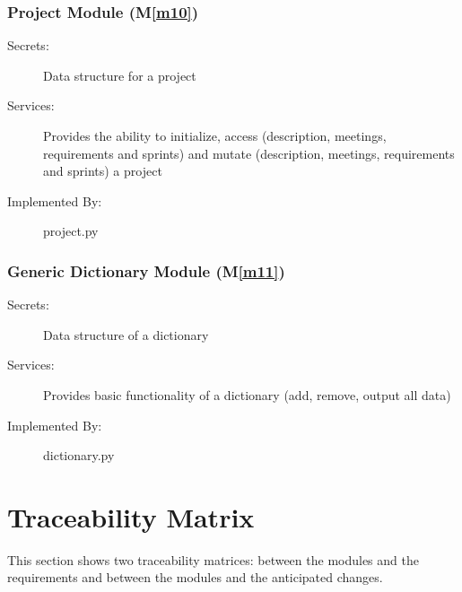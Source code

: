 \documentclass[12pt, titlepage]{article}
\newcommand{\mref}[1]{M\ref{#1}}
\begin{document}
\subsubsection{Project Module (\mref{m10})}
\begin{description}
    \item[Secrets:] Data structure for a project
    \item[Services:] Provides the ability to initialize, access (description, meetings, requirements and sprints) and mutate (description, meetings, requirements and sprints) a project
    \item[Implemented By:] project.py
\end{description}

\subsubsection{Generic Dictionary Module (\mref{m11})}
\begin{description}
    \item[Secrets:] Data structure of a dictionary
    \item[Services:] Provides basic functionality of a dictionary (add, remove, output all data)
    \item[Implemented By:] dictionary.py
\end{description}

\section{Traceability Matrix} \label{SecTM}

This section shows two traceability matrices: between the modules and the
requirements and between the modules and the anticipated changes.
\end{document}
